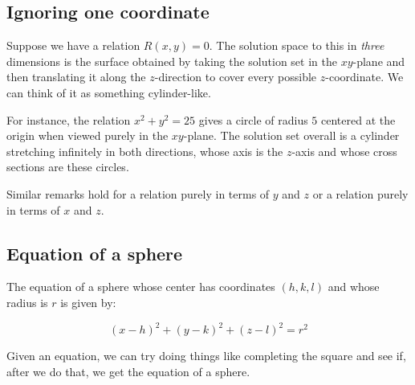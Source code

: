 \documentclass[10pt]{amsart}
\begin{document}
\subsection{Ignoring one coordinate}

Suppose we have a relation $R(x,y) = 0$. The solution space to this in
{\em three} dimensions is the surface obtained by taking the solution
set in the $xy$-plane and then translating it along the $z$-direction
to cover every possible $z$-coordinate. We can think of it as
something cylinder-like.

For instance, the relation $x^2 + y^2 = 25$ gives a circle of radius
$5$ centered at the origin when viewed purely in the $xy$-plane. The
solution set overall is a cylinder stretching infinitely in both
directions, whose axis is the $z$-axis and whose cross sections are
these circles.

Similar remarks hold for a relation purely in terms of $y$ and $z$ or
a relation purely in terms of $x$ and $z$.

\subsection{Equation of a sphere}

The equation of a sphere whose center has coordinates $(h,k,l)$ and
whose radius is $r$ is given by:

$$(x - h)^2 + (y - k)^2 + (z - l)^2 = r^2$$

Given an equation, we can try doing things like completing the square
and see if, after we do that, we get the equation of a sphere.
\end{document}
